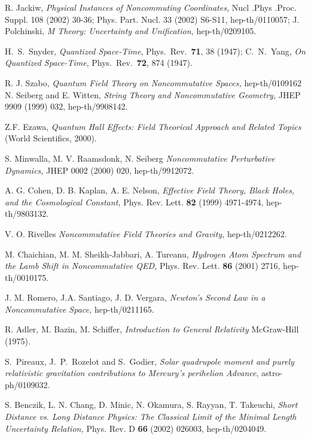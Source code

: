 \documentclass[a4paper,12pt]{article}
\begin{document}
\begin{thebibliography}{99}


R. Jackiw, {\it Physical Instances of Noncommuting Coordinates,}
Nucl .Phys .Proc. Suppl. 108 (2002) 30-36; Phys. Part. Nucl. 33
(2002) S6-S11, hep-th/0110057; J. Polchinski, {\it  M Theory:
Uncertainty and Unification,} hep-th/0209105.


H.~S.~Snyder, {\it Quantized Space-Time}, Phys.\ Rev.\  {\bf 71},
38 (1947); C.~N.~Yang, {\it On Quantized Space-Time}, Phys.\ Rev.\
{\bf 72}, 874 (1947).

R. J. Szabo, {\it Quantum Field Theory on Noncommutative Spaces,} hep-th/0109162
\bibitem{witten:gnus}
N. Seiberg and E. Witten, {\it String  Theory and Noncommutative
Geometry,} JHEP 9909 (1999) 032,  hep-th/9908142.

Z.F. Ezawa, {\it Quantum Hall Effects: Field Theorical Approach and Related Topics} (World Scientifics, 2000).

S. Minwalla, M. V. Raamsdonk, N. Seiberg {\it Noncommutative Perturbative Dynamics,}
 JHEP 0002 (2000) 020, hep-th/9912072.

A. G. Cohen, D. B. Kaplan, A. E. Nelson, {\it  Effective Field
Theory, Black Holes, and the Cosmological Constant,} Phys. Rev.
Lett. {\bf 82} (1999) 4971-4974,  hep-th/9803132.

V. O. Rivelles {\it Noncommutative Field Theories and Gravity,} hep-th/0212262.

 M. Chaichian, M. M. Sheikh-Jabbari, A. Tureanu, {\it Hydrogen Atom
 Spectrum and the Lamb Shift in Noncommutative QED,}   Phys. Rev. Lett. {\bf 86} (2001) 2716, hep-th/0010175.

J. M. Romero, J.A. Santiago, J. D. Vergara, {\it Newton's Second Law in a Noncommutative Space,}
hep-th/0211165.

R. Adler, M. Bazin, M. Schiffer, {\it Introduction to General
Relativity} McGraw-Hill (1975).

S.~Pireaux, J.~P.~Rozelot and S.~Godier, {\it Solar quadrupole
moment and purely relativistic gravitation contributions to
Mercury's perihelion Advance}, astro-ph/0109032.


S. Benczik, L. N. Chang, D. Minic, N. Okamura, S. Rayyan, T.
Takeuchi, {\it Short Distance vs. Long Distance Physics: The
Classical Limit of the Minimal Length Uncertainty Relation,} Phys.
Rev. D {\bf 66} (2002) 026003, hep-th/0204049.

\end{thebibliography}
\end{document}
